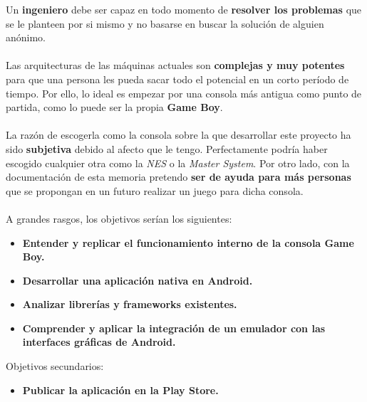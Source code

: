 Un \textbf{ingeniero} debe ser capaz en todo momento de \textbf{resolver los problemas} que se le planteen por si mismo y no basarse en buscar la solución de alguien anónimo.\\ \\
Las arquitecturas de las máquinas actuales son \textbf{complejas y muy potentes} para que una persona les pueda sacar todo el potencial en un corto período de tiempo. Por ello, lo ideal es empezar por una consola más antigua como punto de partida, como lo puede ser la propia \textbf{Game Boy}.\\ \\
La razón de escogerla como la consola sobre la que desarrollar este proyecto ha sido \textbf{subjetiva} debido al afecto que le tengo. Perfectamente podría haber escogido cualquier otra como la \textit{NES} o la \textit{Master System}. Por otro lado, con la documentación de esta memoria pretendo \textbf{ser de ayuda para más personas} que se propongan en un futuro realizar un juego para dicha consola.\\ \\
A grandes rasgos, los objetivos serían los siguientes:\\
\begin{itemize}
    \item \textbf{Entender y replicar el funcionamiento interno de la consola Game Boy.}
    \item \textbf{Desarrollar una aplicación nativa en Android.}
    \item \textbf{Analizar librerías y frameworks existentes.}
    \item \textbf{Comprender y aplicar la integración de un emulador con las interfaces gráficas de Android.}
\end{itemize}

Objetivos secundarios:

\begin{itemize}
	\item \textbf{Publicar la aplicación en la Play Store.}
\end{itemize}

\cleardoublepage

